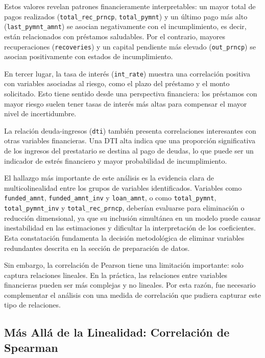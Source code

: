 \documentclass[12pt,a4paper]{article}
\begin{document}
Estos valores revelan patrones financieramente interpretables: un mayor total de pagos realizados (\texttt{total\_rec\_prncp}, \texttt{total\_pymnt}) y un último pago más alto (\texttt{last\_pymnt\_amnt}) se asocian negativamente con el incumplimiento, es decir, están relacionados con préstamos saludables. Por el contrario, mayores recuperaciones (\texttt{recoveries}) y un capital pendiente más elevado (\texttt{out\_prncp}) se asocian positivamente con estados de incumplimiento.

En tercer lugar, la tasa de interés (\texttt{int\_rate}) muestra una correlación positiva con variables asociadas al riesgo, como el plazo del préstamo y el monto solicitado. Esto tiene sentido desde una perspectiva financiera: los préstamos con mayor riesgo suelen tener tasas de interés más altas para compensar el mayor nivel de incertidumbre.

La relación deuda-ingresos (\texttt{dti}) también presenta correlaciones interesantes con otras variables financieras. Una DTI alta indica que una proporción significativa de los ingresos del prestatario se destina al pago de deudas, lo que puede ser un indicador de estrés financiero y mayor probabilidad de incumplimiento.

El hallazgo más importante de este análisis es la evidencia clara de multicolinealidad entre los grupos de variables identificados. Variables como \texttt{funded\_amnt}, \texttt{funded\_amnt\_inv} y \texttt{loan\_amnt}, o como \texttt{total\_pymnt}, \texttt{total\_pymnt\_inv} y \texttt{total\_rec\_prncp}, deberían evaluarse para eliminación o reducción dimensional, ya que su inclusión simultánea en un modelo puede causar inestabilidad en las estimaciones y dificultar la interpretación de los coeficientes. Esta constatación fundamenta la decisión metodológica de eliminar variables redundantes descrita en la sección de preparación de datos.

Sin embargo, la correlación de Pearson tiene una limitación importante: solo captura relaciones lineales. En la práctica, las relaciones entre variables financieras pueden ser más complejas y no lineales. Por esta razón, fue necesario complementar el análisis con una medida de correlación que pudiera capturar este tipo de relaciones.

\subsection{Más Allá de la Linealidad: Correlación de Spearman}
\end{document}
